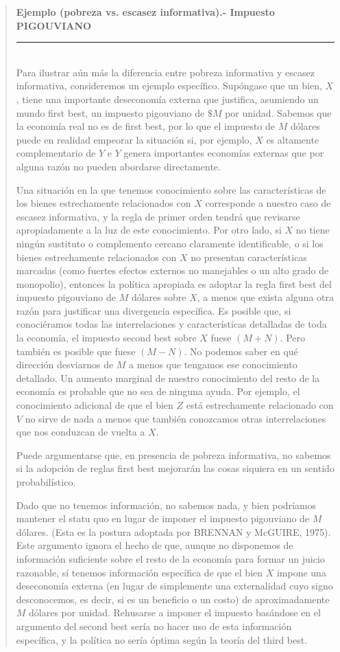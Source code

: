 \documentclass[10pt,a4paper]{article}
\newenvironment{specialblock}[1]{%
      \begin{quote} %
      \small %
      \noindent\textbf{#1}\\[-0.3em] %
      \rule{\linewidth}{0.4pt}\\[0.6em]}{
      \end{quote}}
\begin{document}
\begin{specialblock}{Ejemplo (pobreza vs. escasez informativa).- Impuesto PIGOUVIANO }
    Para ilustrar aún más la diferencia entre pobreza informativa y escasez informativa, consideremos un ejemplo específico. Supóngase que un bien, $X$, tiene una importante deseconomía externa que justifica, asumiendo un mundo first best, un impuesto pigouviano de $\$M$ por unidad. Sabemos que la economía real no es de first best, por lo que el impuesto de $M$ dólares puede en realidad empeorar la situación si, por ejemplo, $X$ es altamente complementario de $Y$ e $Y$ genera importantes economías externas que por alguna razón no pueden abordarse directamente. 

    Una situación en la que tenemos conocimiento sobre las características de los bienes estrechamente relacionados con $X$ corresponde a nuestro caso de escasez informativa, y la regla de primer orden tendrá que revisarse apropiadamente a la luz de este conocimiento. Por otro lado, si $X$ no tiene ningún sustituto o complemento cercano claramente identificable, o si los bienes estrechamente relacionados con $X$ no presentan características marcadas (como fuertes efectos externos no manejables o un alto grado de monopolio), entonces la política apropiada es adoptar la regla first best del impuesto pigouviano de $M$ dólares sobre $X$, a menos que exista alguna otra razón para justificar una divergencia específica. Es posible que, si conociéramos todas las interrelaciones y características detalladas de toda la economía, el impuesto second best sobre $X$ fuese $(M + N)$. Pero también es posible que fuese $(M - N)$. No podemos saber en qué dirección desviarnos de $M$ a menos que tengamos ese conocimiento detallado. Un aumento marginal de nuestro conocimiento del resto de la economía es probable que no sea de ninguna ayuda. Por ejemplo, el conocimiento adicional de que el bien $Z$ está estrechamente relacionado con $V$ no sirve de nada a menos que también conozcamos otras interrelaciones que nos conduzcan de vuelta a $X$.

    Puede argumentarse que, en presencia de pobreza informativa, no sabemos si la adopción de reglas first best mejorarán las cosas siquiera en un sentido probabilístico. 

    Dado que no tenemos información, no sabemos nada, y bien podríamos mantener el statu quo en lugar de imponer el impuesto pigouviano de $M$ dólares. (Esta es la postura adoptada por BRENNAN y McGUIRE, 1975). Este argumento ignora el hecho de que, aunque no disponemos de información suficiente sobre el resto de la economía para formar un juicio razonable, sí tenemos información específica de que el bien $X$ impone una deseconomía externa (en lugar de simplemente una externalidad cuyo signo desconocemos, es decir, si es un beneficio o un costo) de aproximadamente $M$ dólares por unidad. Rehusarse a imponer el impuesto basándose en el argumento del second best sería no hacer uso de esta información específica, y la política no sería óptima según la teoría del third best. 
\end{specialblock}
\end{document}
